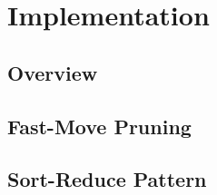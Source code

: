 \section{Implementation}
\subsection{Overview}
\subsection{Fast-Move Pruning}
\subsection{Sort-Reduce Pattern}